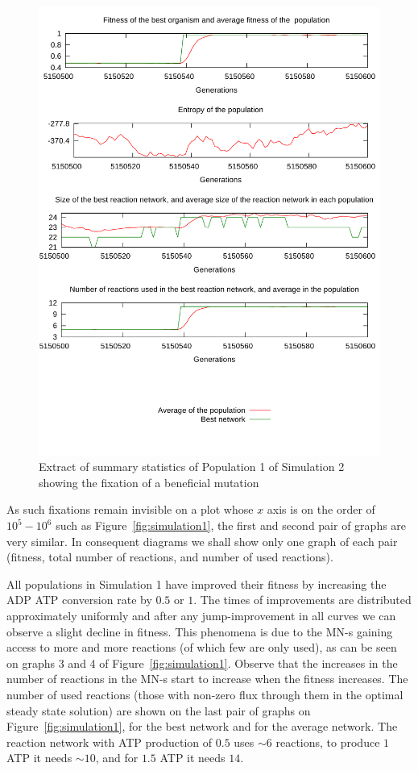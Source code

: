 \documentclass[a4paper,12pt]{article}
\begin{document}
\begin{figure}[htpb]
	\centering
	\includegraphics[width=0.8\linewidth]{fixation.pdf}
	\caption{Extract of summary statistics of Population 1 of Simulation 2 showing the fixation of a beneficial mutation}
	\label{fig:fixation}
\end{figure}

As such fixations remain invisible on a plot whose $x$ axis is on the order of $10^5-10^6$ such as Figure~\ref{fig:simulation1}, the first and second pair of graphs are very similar. In consequent diagrams we shall show only one graph of each pair (fitness, total number of reactions, and number of used reactions).

All populations in Simulation 1 have improved their fitness by increasing the ADP ATP conversion rate by $0.5$ or $1$. The times of improvements are distributed approximately uniformly and after any jump-improvement in all curves we can observe a slight decline in fitness. This phenomena is due to the MN-s gaining access to more and more reactions (of which few are only used), as can be seen on graphs 3 and 4 of Figure~\ref{fig:simulation1}. Observe that the increases in the number of reactions in the MN-s start to increase when the fitness increases. The number of used reactions (those with non-zero flux through them in the optimal steady state solution) are shown on the last pair of graphs on Figure~\ref{fig:simulation1}, for the best network and for the average network. The reaction network with ATP production of $0.5$ uses $\sim 6$ reactions, to produce $1$ ATP it needs $\sim 10$, and for $1.5$ ATP it needs $14$. 
\end{document}
